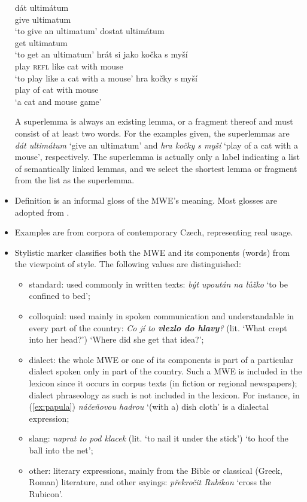 \documentclass[output=paper,colorlinks,citecolor=brown]{langscibook}
\begin{document}
\begin{itemize}
\ea \label{ex:ultimatum}
\ea
    \gll dát ultimátum\\
    give ultimatum\\
    \glt `to give an ultimatum' \label{ex:dat-ultimatum}
\ex
    \gll dostat ultimátum\\
    get ultimatum \\
    \glt `to get an ultimatum' \label{ex:dostat-ultimatum}
    \z
\ex \label{ex:kocka}
\ea
    \gll hrát si jako kočka s myší\\
    play \textsc{refl} like cat with mouse\\
    \glt `to play like a cat with a mouse' \label{ex:kocka-verb}
\ex
    \gll hra kočky s myší\\
    play {of cat} with mouse\\
    \glt `a cat and mouse game' \label{ex:kocka-nom}
\z
\z 



A superlemma is always an existing lemma, or a fragment thereof and must consist of at least two words. For the examples given, the superlemmas are \emph{dát ultimátum} `give an ultimatum' and \emph{hra kočky s myší} `play of a cat with a mouse', respectively. The superlemma is actually only a label indicating a list of semantically linked lemmas, and we select the shortest lemma or fragment from the list as the superlemma.

\item Definition is an informal gloss of the MWE's meaning. Most glosses are adopted from \citet{Cermak:2009}.

\item Examples are from corpora of contemporary Czech, representing real usage.

\item Stylistic marker classifies both the MWE and its components (words) from the viewpoint of style. The following values are distinguished:

\begin{itemize}
    \item standard: used commonly in written texts: \emph{být upoután na lůžko} ‘to be confined to bed’;
    \item colloquial: used mainly in spoken communication and understandable in every part of the country: \emph{Co jí to \textbf{vlezlo do hlavy}?} (lit. `What crept into her head?') ‘Where did she get that idea?’;
    \item dialect: the whole MWE or one of its components is part of a particular dialect spoken only in part of the country. Such a MWE is included in the lexicon since it occurs in corpus texts (in fiction or regional newspapers); dialect phraseology as such is not included in the lexicon. For instance, in (\ref{ex:papula}) \emph{náčeňovou hadrou} ‘(with a) dish cloth’ is a dialectal expression;
    \item slang: \emph{naprat to pod klacek} (lit. `to nail it under the stick') ‘to hoof the ball into the net’;
    \item other: literary expressions, mainly from the Bible or classical (Greek, Roman) literature, and other sayings: \emph{překročit Rubikon} ‘cross the Rubicon’.
\end{itemize}


\end{itemize}
\end{document}
